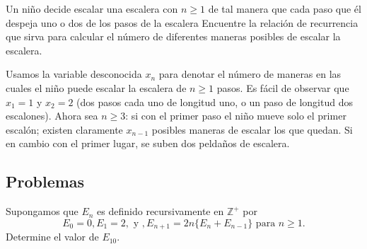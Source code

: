 \begin{example}[La escalera]
	Un niño decide escalar una escalera con $n\geq 1$ de tal manera que cada paso que él despeja uno o dos de los pasos de la escalera %
	Encuentre la relación de recurrencia que sirva para calcular el número de diferentes maneras posibles de escalar la escalera.
\end{example}
Usamos la variable desconocida $x_{n}$ para denotar el número de maneras en las cuales el niño puede escalar la escalera de $n\geq1$ pasos. Es fácil de observar que $x_{1}=1$ y $x_{2}=2$ (dos pasos cada uno de longitud uno, o un paso de longitud dos escalones). Ahora sea $n\geq3$: si con el primer paso el niño mueve solo el primer escalón; existen claramente $x_{n-1}$ posibles maneras de escalar los que quedan. Si en cambio con el primer lugar, se suben dos peldaños de escalera.
%
%
%
%
%
%
%
%
%

\subsection{Problemas}

\begin{exercise}
Supongamos que $E_n$ es definido recursivamente en $\mathds{Z}^+$ por \[ E_0=0,E_1=2,\text{ y },E_{n+1}=2n\{E_n+E_{n-1}\} \text{ para }n\geq 1. \] Determine el valor de $E_{10}$.
\end{exercise}


